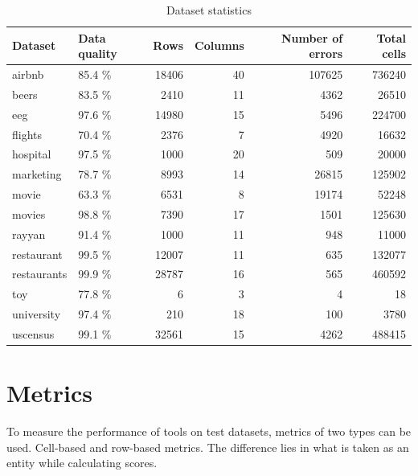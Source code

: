 \begin{table}
\begin{tabular}{llrrrr}
\toprule
     Dataset & Data quality &   Rows &  Columns &  Number of errors &  Total cells \\
\midrule
      airbnb &       85.4 \% &  18406 &       40 &            107625 &       736240 \\
       beers &       83.5 \% &   2410 &       11 &              4362 &        26510 \\
         eeg &       97.6 \% &  14980 &       15 &              5496 &       224700 \\
     flights &       70.4 \% &   2376 &        7 &              4920 &        16632 \\
    hospital &       97.5 \% &   1000 &       20 &               509 &        20000 \\
   marketing &       78.7 \% &   8993 &       14 &             26815 &       125902 \\
       movie &       63.3 \% &   6531 &        8 &             19174 &        52248 \\
      movies &       98.8 \% &   7390 &       17 &              1501 &       125630 \\
      rayyan &       91.4 \% &   1000 &       11 &               948 &        11000 \\
  restaurant &       99.5 \% &  12007 &       11 &               635 &       132077 \\
 restaurants &       99.9 \% &  28787 &       16 &               565 &       460592 \\
         toy &       77.8 \% &      6 &        3 &                 4 &           18 \\
  university &       97.4 \% &    210 &       18 &               100 &         3780 \\
    uscensus &       99.1 \% &  32561 &       15 &              4262 &       488415 \\
\bottomrule
\end{tabular}
\caption{Dataset statistics}
\label{tab:dataset_statistics}
\end{table}

\section{Metrics}
\label{sec:metrics}
To measure the performance of tools on test datasets, metrics of two types can be used. Cell-based and row-based metrics. The difference lies in what is taken as an entity while calculating scores.

